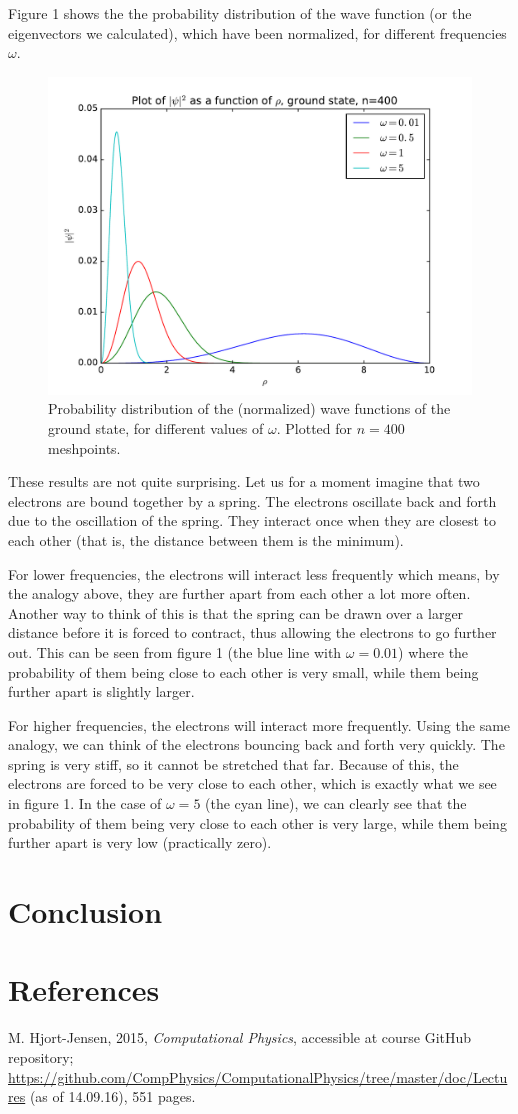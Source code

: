 \documentclass[12pt]{article}
\begin{document}
Figure 1 shows the the probability distribution of the wave function (or the eigenvectors we calculated), which have been normalized, for different frequencies $\omega$.
\begin{figure}[hbtp]
\centering
\includegraphics[width=\linewidth]{Plots/Plot_groundstate_n400.pdf}
\caption{Probability distribution of the (normalized) wave functions of the ground state, for different values of $\omega$. Plotted for $n=400$ meshpoints.}
\end{figure}
These results are not quite surprising. Let us for a moment imagine that two electrons are bound together by a spring. The electrons oscillate back and forth due to the oscillation of the spring. They interact once when they are closest to each other (that is, the distance between them is the minimum).

For lower frequencies, the electrons will interact less frequently which means, by the analogy above, they are further apart from each other a lot more often. Another way to think of this is that the spring can be drawn over a larger distance before it is forced to contract, thus allowing the electrons to go further out. This can be seen from figure 1 (the blue line with $\omega = 0.01$) where the probability of them being close to each other is very small, while them being further apart is slightly larger.

For higher frequencies, the electrons will interact more frequently. Using the same analogy, we can think of the electrons bouncing back and forth very quickly. The spring is very stiff, so it cannot be stretched that far. Because of this, the electrons are forced to be very close to each other, which is exactly what we see in figure 1. In the case of $\omega = 5$ (the cyan line), we can clearly see that the probability of them being very close to each other is very large, while them being further apart is very low (practically zero).
\section{Conclusion}

\section{References}
M. Hjort-Jensen, 2015, \textit{Computational Physics}, accessible at course GitHub repository; \url{https://github.com/CompPhysics/ComputationalPhysics/tree/master/doc/Lectures} (as of 14.09.16), 551 pages.
\end{document}
